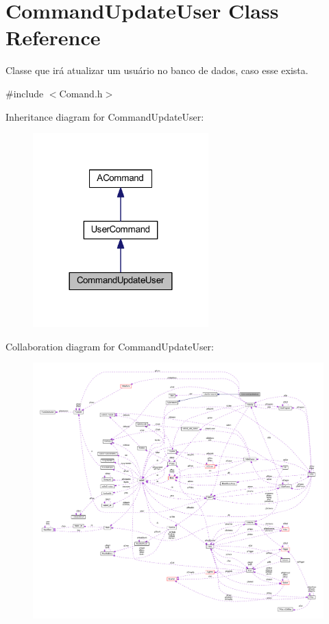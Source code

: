 \hypertarget{class_command_update_user}{\section{Command\-Update\-User Class Reference}
\label{class_command_update_user}
}


Classe que irá atualizar um usuário no banco de dados, caso esse exista.  




{\ttfamily \#include $<$Comand.\-h$>$}



Inheritance diagram for Command\-Update\-User\-:\nopagebreak
\begin{figure}[H]
\begin{center}
\leavevmode
\includegraphics[width=192pt]{class_command_update_user__inherit__graph}
\end{center}
\end{figure}


Collaboration diagram for Command\-Update\-User\-:\nopagebreak
\begin{figure}[H]
\begin{center}
\leavevmode
\includegraphics[width=350pt]{class_command_update_user__coll__graph}
\end{center}
\end{figure}
